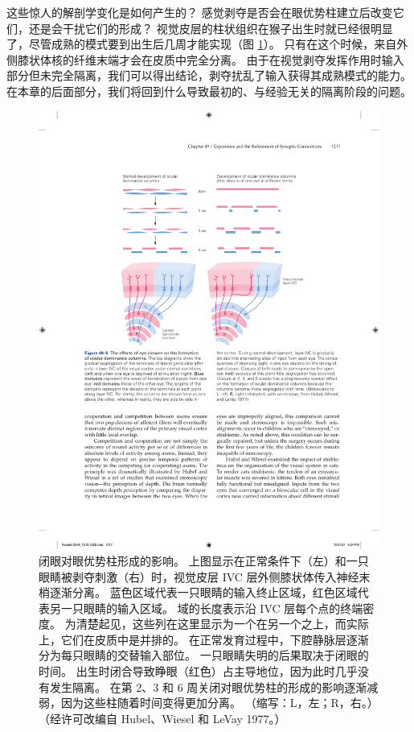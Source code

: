 这些惊人的解剖学变化是如何产生的？
感觉剥夺是否会在眼优势柱建立后改变它们，还是会干扰它们的形成？
视觉皮层的柱状组织在猴子出生时就已经很明显了，尽管成熟的模式要到出生后几周才能实现（图 \ref{fig:49_5}）。
只有在这个时候，来自外侧膝状体核的纤维末端才会在皮质中完全分离。
由于在视觉剥夺发挥作用时输入部分但未完全隔离，我们可以得出结论，剥夺扰乱了输入获得其成熟模式的能力。
在本章的后面部分，我们将回到什么导致最初的、与经验无关的隔离阶段的问题。


\begin{figure}[htbp]
	\centering
	\includegraphics[width=0.8\linewidth]{chap49/fig_49_5}
	\caption{闭眼对眼优势柱形成的影响。 上图显示在正常条件下（左）和一只眼睛被剥夺刺激（右）时，视觉皮层 IVC 层外侧膝状体传入神经末梢逐渐分离。 蓝色区域代表一只眼睛的输入终止区域，红色区域代表另一只眼睛的输入区域。 域的长度表示沿 IVC 层每个点的终端密度。 为清楚起见，这些列在这里显示为一个在另一个之上，而实际上，它们在皮质中是并排的。 在正常发育过程中，下腔静脉层逐渐分为每只眼睛的交替输入部位。 一只眼睛失明的后果取决于闭眼的时间。 出生时闭合导致睁眼（红色）占主导地位，因为此时几乎没有发生隔离。 在第 2、3 和 6 周关闭对眼优势柱的形成的影响逐渐减弱，因为这些柱随着时间变得更加分离。 （缩写：L，左；R，右。）（经许可改编自 Hubel、Wiesel 和 LeVay 1977。）}
	\label{fig:49_5}
\end{figure}


